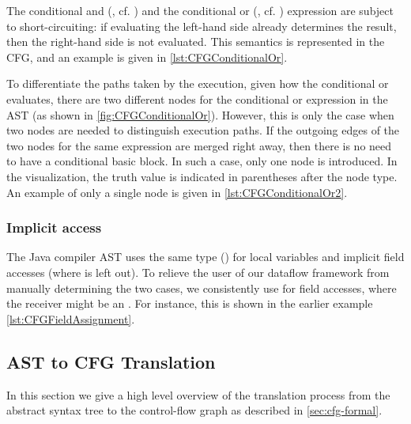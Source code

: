 The conditional and (\code{&&}, cf. ) and the conditional
or (\code{||}, cf. ) expression are subject to short-circuiting:
if evaluating the left-hand side already determines the result, then the right-hand
side is not evaluated. This semantics is represented in the CFG, and an example
is given in \autoref{lst:CFGConditionalOr}.

To differentiate the paths taken by the execution, given how the conditional or evaluates,
there are two different nodes for the conditional or expression in the AST
(as shown in \autoref{fig:CFGConditionalOr}). However, this is only the case when
two nodes are needed to distinguish execution paths. If the outgoing edges
of the two nodes for the same expression are merged right away, then there is
no need to have a conditional basic block. In such a case, only one
node is introduced. In the visualization, the truth value is indicated in
parentheses after the node type. An example of only a single node is given in
\autoref{lst:CFGConditionalOr2}.




\subsubsection{Implicit  access}

The Java compiler AST uses the same type () for local variables
and implicit field accesses (where  is left out).
To relieve the user of our dataflow framework from manually determining
the two cases, we consistently use  for field accesses,
where the receiver might be an .
For instance, this is shown in the earlier example \autoref{lst:CFGFieldAssignment}.



\subsection{AST to CFG Translation}
\label{sec:ast_to_cfg_translation}

In this section we give a high level overview of the translation process from the
abstract syntax tree to the control-flow graph as described in \autoref{sec:cfg-formal}.

